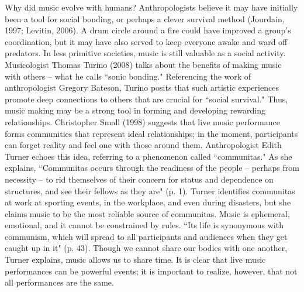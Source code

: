 Why did music evolve with humans? Anthropologists believe it may have initially been a tool for social bonding, or perhaps a clever survival method (Jourdain, 1997; Levitin, 2006). A drum circle around a fire could have improved a group's coordination, but it may have also served to keep everyone awake and ward off predators. In less primitive societies, music is still valuable as a social activity. Musicologist Thomas Turino (2008) talks about the benefits of making music with others -- what he calls ``sonic bonding." Referencing the work of anthropologist Gregory Bateson, Turino posits that such artistic experiences promote deep connections to others that are crucial for ``social survival." Thus, music making may be a strong tool in forming and developing rewarding relationships. Christopher Small (1998) suggests that live music performance forms communities that represent ideal relationships; in the moment, participants can forget reality and feel one with those around them. Anthropologist Edith Turner echoes this idea, referring to a phenomenon called ``communitas." As she explains, ``Communitas occurs through the readiness of the people -- perhaps from necessity -- to rid themselves of their concern for status and dependence on structures, and see their fellows as they are" (p. 1). Turner identifies communitas at work at sporting events, in the workplace, and even during disasters, but she claims music to be the most reliable source of communitas. Music is ephemeral, emotional, and it cannot be constrained by rules. ``Its life is synonymous with communism, which will spread to all participants and audiences when they get caught up in it" (p. 43). Though we cannot share our bodies with one another, Turner explains, music allows us to share time. It is clear that live music performances can be powerful events; it is important to realize, however, that not all performances are the same.
